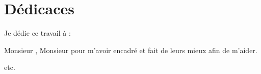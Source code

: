 \chapter*{\Huge Dédicaces}

\begingroup
    \large \raggedright Je dédie ce travail à :
    \vspace{4mm}
    
    Monsieur \textbf{\@proFramerName}, Monsieur \textbf{\@academicFramerName} pour m'avoir encadré et fait de leurs mieux afin de m'aider.
    
    \vspace{4mm}
    etc.
\endgroup

\vspace{8mm}
\begin{flushright}
    \LARGE \@author
\end{flushright}